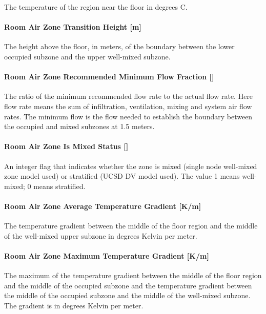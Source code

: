 The temperature of the region near the floor in degrees C.

\paragraph{Room Air Zone Transition Height {[}m{]}}\label{room-air-zone-transition-height-m}

The height above the floor, in meters, of the boundary between the lower occupied subzone and the upper well-mixed subzone.

\paragraph{Room Air Zone Recommended Minimum Flow Fraction {[]}}\label{room-air-zone-recommended-minimum-flow-fraction}

The ratio of the minimum recommended flow rate to the actual flow rate. Here flow rate means the sum of infiltration, ventilation, mixing and system air flow rates. The minimum flow is the flow needed to establish the boundary between the occupied and mixed subzones at 1.5 meters.

\paragraph{Room Air Zone Is Mixed Status {[]}}\label{room-air-zone-is-mixed-status}

An integer flag that indicates whether the zone is mixed (single node well-mixed zone model used) or stratified (UCSD DV model used). The value 1 means well-mixed; 0 means stratified.

\paragraph{Room Air Zone Average Temperature Gradient {[}K/m{]}}\label{room-air-zone-average-temperature-gradient-km}

The temperature gradient between the middle of the floor region and the middle of the well-mixed upper subzone in degrees Kelvin per meter.

\paragraph{Room Air Zone Maximum Temperature Gradient {[}K/m{]}}\label{room-air-zone-maximum-temperature-gradient-km}

The maximum of the temperature gradient between the middle of the floor region and the middle of the occupied subzone and the temperature gradient between the middle of the occupied subzone and the middle of the well-mixed subzone. The gradient is in degrees Kelvin per meter.

